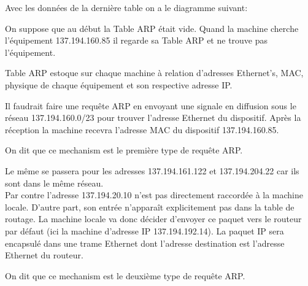 \documentclass{article}
\begin{document}
\begin{resolution}
    Avec les données de la dernière table on a le diagramme suivant:
    \begin{figure}[H]
        \centering{}
    \end{figure}
    On suppose que au début la Table ARP était vide. Quand la machine cherche l'équipement 137.194.160.85 il regarde sa Table ARP et ne trouve pas l'équipement.
    \begin{remark}
        Table ARP estoque sur chaque machine à relation d'adresses Ethernet's, MAC, physique de chaque équipement et son respective adresse IP.
    \end{remark}
    Il faudrait faire une requête ARP en envoyant une signale en diffusion sous le réseau 137.194.160.0/23 pour trouver l'adresse Ethernet du dispositif. Après la réception la machine recevra l'adresse MAC du dispositif 137.194.160.85.
    \begin{remark}
        On dit que ce mechanism est le première type de requête ARP.
    \end{remark}
    Le même se passera pour les adresses 137.194.161.122 et 137.194.204.22 car ils sont dans le même réseau.\\

    Par contre l'adresse 137.194.20.10 n'est pas directement raccordée à la machine locale. D'autre part, son entrée n'apparaît explicitement pas dans la table de routage. La machine locale va donc décider d'envoyer ce paquet vers le routeur par défaut (ici la machine d'adresse IP 137.194.192.14). La paquet IP sera encapsulé dans une trame Ethernet dont l'adresse destination est l'adresse Ethernet du routeur.
    \begin{remark}
        On dit que ce mechanism est le deuxième type de requête ARP.
    \end{remark}
\end{resolution}
\end{document}
